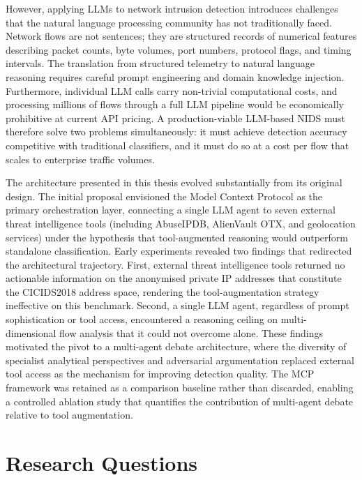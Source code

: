 However, applying LLMs to network intrusion detection introduces challenges that the natural language processing community has not traditionally faced. Network flows are not sentences; they are structured records of numerical features describing packet counts, byte volumes, port numbers, protocol flags, and timing intervals. The translation from structured telemetry to natural language reasoning requires careful prompt engineering and domain knowledge injection. Furthermore, individual LLM calls carry non-trivial computational costs, and processing millions of flows through a full LLM pipeline would be economically prohibitive at current API pricing. A production-viable LLM-based NIDS must therefore solve two problems simultaneously: it must achieve detection accuracy competitive with traditional classifiers, and it must do so at a cost per flow that scales to enterprise traffic volumes.

The architecture presented in this thesis evolved substantially from its original design. The initial proposal envisioned the Model Context Protocol \autocite{Anthropic2024} as the primary orchestration layer, connecting a single LLM agent to seven external threat intelligence tools (including AbuseIPDB, AlienVault OTX, and geolocation services) under the hypothesis that tool-augmented reasoning would outperform standalone classification. Early experiments revealed two findings that redirected the architectural trajectory. First, external threat intelligence tools returned no actionable information on the anonymised private IP addresses that constitute the CICIDS2018 address space, rendering the tool-augmentation strategy ineffective on this benchmark. Second, a single LLM agent, regardless of prompt sophistication or tool access, encountered a reasoning ceiling on multi-dimensional flow analysis that it could not overcome alone. These findings motivated the pivot to a multi-agent debate architecture, where the diversity of specialist analytical perspectives and adversarial argumentation replaced external tool access as the mechanism for improving detection quality. The MCP framework was retained as a comparison baseline rather than discarded, enabling a controlled ablation study that quantifies the contribution of multi-agent debate relative to tool augmentation.

\section{Research Questions}
\label{sec:research-questions}

